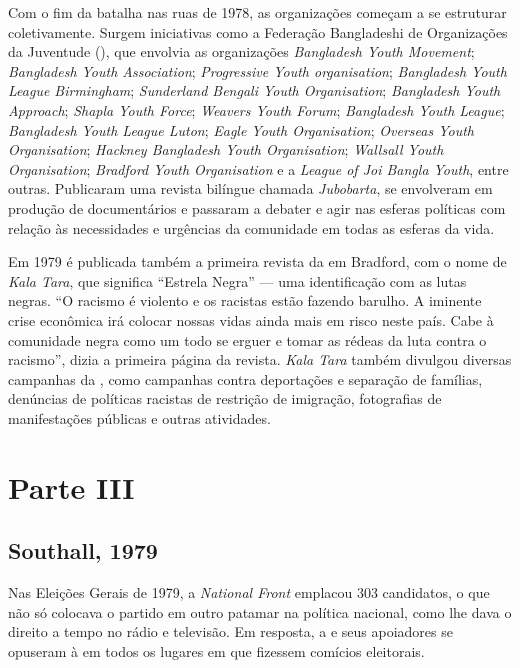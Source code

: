 Com o fim da batalha nas ruas de 1978, as organizações começam a se estruturar coletivamente. Surgem iniciativas como a Federação Bangladeshi de Organizações da Juventude (), que envolvia as organizações \emph{Bangladesh Youth Movement}; \emph{Bangladesh Youth Association}; \emph{Progressive Youth organisation}; \emph{Bangladesh Youth League Birmingham}; \emph{Sunderland Bengali Youth Organisation}; \emph{Bangladesh Youth Approach}; \emph{Shapla Youth Force}; \emph{Weavers Youth Forum}; \emph{Bangladesh Youth League}; \emph{Bangladesh Youth League Luton}; \emph{Eagle Youth Organisation}; \emph{Overseas Youth Organisation}; \emph{Hackney Bangladesh Youth Organisation}; \emph{Wallsall Youth Organisation}; \emph{Bradford Youth Organisation} e a \emph{League of Joi Bangla Youth}, entre outras. Publicaram uma revista bilíngue chamada \emph{Jubobarta}, se envolveram em produção de documentários e passaram a debater e agir nas esferas políticas com relação às necessidades e urgências da comunidade em todas as esferas da vida.


Em 1979 é publicada também a primeira revista da  em Bradford, com o nome de \emph{Kala Tara}, que significa ``Estrela Negra'' --- uma identificação com as lutas negras. ``O racismo é violento e os racistas estão fazendo barulho. A iminente crise econômica irá colocar nossas vidas ainda mais em risco neste país. Cabe à comunidade negra como um todo se erguer e tomar as rédeas da luta contra o racismo'', dizia a primeira página da revista. \emph{Kala Tara} também divulgou diversas campanhas da , como campanhas contra deportações e separação de famílias, denúncias de políticas racistas de restrição de imigração, fotografias de manifestações públicas e outras atividades.

\section{Parte III}

\subsection{Southall, 1979}

Nas Eleições Gerais de 1979, a \emph{National Front} emplacou 303 candidatos, o que não só colocava o partido em outro patamar na política nacional, como lhe dava o direito a tempo no rádio e televisão. Em resposta, a  e seus apoiadores se opuseram à  em todos os lugares em que fizessem comícios eleitorais.

